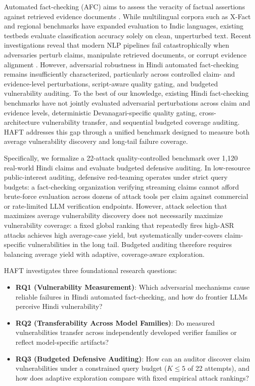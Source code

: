 \documentclass[11pt]{article}
\begin{document}
Automated fact-checking (AFC) aims to assess the veracity of factual assertions against retrieved evidence documents \citep{thorne2018fever,schuster2021vitaminc}. While multilingual corpora such as X-Fact \citep{gupta2021xfact} and regional benchmarks \citep{kumar2022hindi} have expanded evaluation to Indic languages, existing testbeds evaluate classification accuracy solely on clean, unperturbed text. Recent investigations reveal that modern NLP pipelines fail catastrophically when adversaries perturb claims, manipulate retrieved documents, or corrupt evidence alignment \citep{wang2021textflint,liu2025adversarial}. However, adversarial robustness in Hindi automated fact-checking remains insufficiently characterized, particularly across controlled claim- and evidence-level perturbations, script-aware quality gating, and budgeted vulnerability auditing. To the best of our knowledge, existing Hindi fact-checking benchmarks have not jointly evaluated adversarial perturbations across claim and evidence levels, deterministic Devanagari-specific quality gating, cross-architecture vulnerability transfer, and sequential budgeted coverage auditing. HAFT addresses this gap through a unified benchmark designed to measure both average vulnerability discovery and long-tail failure coverage.

Specifically, we formalize a 22-attack quality-controlled benchmark over 1,120 real-world Hindi claims and evaluate budgeted defensive auditing. In low-resource public-interest auditing, defensive red-teaming operates under strict query budgets: a fact-checking organization verifying streaming claims cannot afford brute-force evaluation across dozens of attack tools per claim against commercial or rate-limited LLM verification endpoints. However, attack selection that maximizes average vulnerability discovery does not necessarily maximize vulnerability coverage: a fixed global ranking that repeatedly fires high-ASR attacks achieves high average-case yield, but systematically under-covers claim-specific vulnerabilities in the long tail. Budgeted auditing therefore requires balancing average yield with adaptive, coverage-aware exploration.


HAFT investigates three foundational research questions:
\begin{itemize}[leftmargin=1.1em,itemsep=0pt,topsep=1pt]
\item \textbf{RQ1 (Vulnerability Measurement)}: Which adversarial mechanisms cause reliable failures in Hindi automated fact-checking, and how do frontier LLMs perceive Hindi vulnerability?
\item \textbf{RQ2 (Transferability Across Model Families)}: Do measured vulnerabilities transfer across independently developed verifier families or reflect model-specific artifacts?
\item \textbf{RQ3 (Budgeted Defensive Auditing)}: How can an auditor discover claim vulnerabilities under a constrained query budget ($K \le 5$ of 22 attempts), and how does adaptive exploration compare with fixed empirical attack rankings?
\end{itemize}
\end{document}
